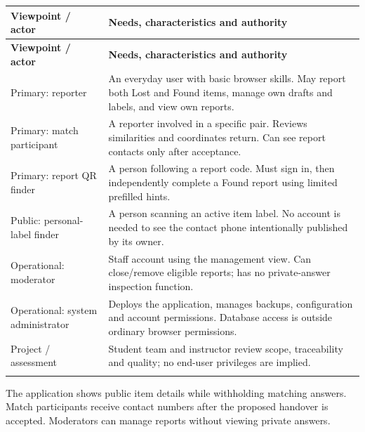 \documentclass[12pt,a4paper,oneside]{report}
\begin{document}
\begin{longtable}{@{}P{0.29\dimexpr\textwidth-12pt\relax}P{0.71\dimexpr\textwidth-12pt\relax}@{}}

\toprule \textbf{Viewpoint / actor} & \textbf{Needs, characteristics and authority} \\ \midrule\endfirsthead

\toprule \textbf{Viewpoint / actor} & \textbf{Needs, characteristics and authority} \\ \midrule\endhead

\bottomrule\endfoot

Primary: reporter & An everyday user with basic browser skills. May report both Lost and Found items, manage own drafts and labels, and view own reports. \\ \addlinespace[3pt]

Primary: match participant & A reporter involved in a specific pair. Reviews similarities and coordinates return. Can see report contacts only after acceptance. \\ \addlinespace[3pt]

Primary: report QR finder & A person following a report code. Must sign in, then independently complete a Found report using limited prefilled hints. \\ \addlinespace[3pt]

Public: personal-label finder & A person scanning an active item label. No account is needed to see the contact phone intentionally published by its owner. \\ \addlinespace[3pt]

Operational: moderator & Staff account using the management view. Can close/remove eligible reports; has no private-answer inspection function. \\ \addlinespace[3pt]

Operational: system administrator & Deploys the application, manages backups, configuration and account permissions. Database access is outside ordinary browser permissions. \\ \addlinespace[3pt]

Project / assessment & Student team and instructor review scope, traceability and quality; no end-user privileges are implied. \\ \addlinespace[3pt]

\end{longtable}

The application shows public item details while withholding matching answers. Match participants receive contact numbers after the proposed handover is accepted. Moderators can manage reports without viewing private answers.
\end{document}

